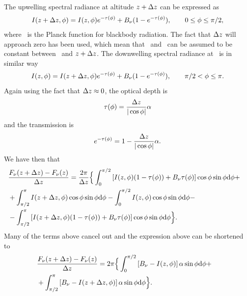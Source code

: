  The upwelling spectral radiance at altitude $z+\Delta z$
 can be expressed as
 \begin{equation}
   I(z+\Delta z,\phi) = 
       I(z,\phi) e^{-\tau(\phi)} +
        B_{\nu}(1-e^{-\tau(\phi)}),\qquad 0\leq\phi\leq\pi/2,
 \end{equation}
 where \planckfunc\ is the Planck function for blackbody radiation.
 The fact that $\Delta z$ will approach zero has been
 used, which mean that \planckfunc\ and \view\ can be assumed to
 be constant between \altitude\ and $z+\Delta z$.
 The downwelling spectral radiance at \altitude\ is in similar way
 \begin{equation}
   I(z,\phi) = 
       I(z+\Delta z,\phi) 
        e^{-\tau(\phi)} +
        B_{\nu}(1-e^{-\tau(\phi)}),\qquad \pi/2<\phi\leq\pi.
 \end{equation}
 Again using the fact that $\Delta z\approx0$, the optical depth is
 \begin{equation}
   \tau(\phi) = \frac{\Delta z}{|\cos\phi|} \alpha
 \end{equation}
 and the transmission is
 \begin{equation}
   e^{-\tau(\phi)} = 
      1 - \frac{\Delta z}{|\cos\phi|} \alpha.
 \end{equation}
 We have then that
 \begin{eqnarray}
   & \frac{F_{\nu}(z+\Delta z)- F_{\nu}(z)}
       {\Delta z} = \frac{2\pi}{\Delta z}\Big\{
     \int_0^{\pi/2} \left[ I(z,\phi)
          (1 - \tau(\phi)) + B_{\nu}\tau(\phi)\right]
          \cos\phi \sin\phi \mathrm{d}\phi + & \nonumber \\
   & + \int_{\pi/2}^\pi I(z+\Delta z,\phi)
          \cos\phi \sin\phi \mathrm{d}\phi - 
       \int_0^{\pi/2} I(z,\phi)
          \cos\phi \sin\phi \mathrm{d}\phi - & \nonumber\\   
   & -\int_{\pi/2}^\pi \left[ I(z+\Delta z,\phi)
          (1 - \tau(\phi)) + B_{\nu}\tau(\phi)\right]
          \cos\phi \sin\phi \mathrm{d}\phi  \Big\}. &
 \end{eqnarray}
 Many of the terms above cancel out and the expression above can be
 shortened to
 \begin{eqnarray}
   \label{eq:diffF}
   & \frac{F_{\nu}(z+\Delta z)- F_{\nu}(z)}
       {\Delta z} = 2\pi\Big\{
     \int_0^{\pi/2} \left[ B_{\nu} -I(z,\phi)
           \right] \alpha \sin\phi \mathrm{d}\phi + & \nonumber \\
   & +\int_{\pi/2}^\pi \left[ B_{\nu} -
                I(z+\Delta z,\phi)
          \right]\alpha \sin\phi \mathrm{d}\phi  \Big\}. &
 \end{eqnarray}
